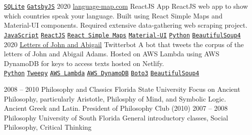 \documentclass[9pt]{developercv} %
\begin{document}
\begin{entrylist}
{        \texttt{{\href{https://www.sqlite.org/index.html}{SQLite}}}\slashsep
        \texttt{{\href{https://www.gatsbyjs.org/}{GatsbyJS}}}
        }
    \entry
        {2020}
        {\href{https://language-map.com}{language-map.com}}
        {ReactJS App}
        {
            ReactJS web app to show which countries speak your language. Built
            using React Simple Maps and Material-UI components. Required
            extensive data-gathering web scraping project.
        \\
        \texttt{{\href{https://en.wikipedia.org/wiki/JavaScript}{JavaScript}}}\slashsep
        \texttt{{\href{https://reactjs.org/}{ReactJS}}}\slashsep
        \texttt{{\href{https://www.react-simple-maps.io/}{React Simple Maps}}}\slashsep
        \texttt{{\href{https://material-ui.com/}{Material-UI}}}\slashsep
        \texttt{{\href{https://www.python.org/}{Python}}}\slashsep
        \texttt{{\href{https://www.crummy.com/software/BeautifulSoup/}{BeautifulSoup4}}}
        }
	\entry
		{2020}
        {{\href{https://twitter.com/john_and_abbie}{Letters of John and Abigail}}}
		{Twitterbot}
        {
            A bot that tweets the corpus of the letters of John and Abigail
            Adams. Hosted on AWS Lambda using AWS DynamoDB for keys to access
            texts hosted on Netlify.
        \\
        \texttt{{\href{https://www.python.org/}{Python}}}\slashsep
        \texttt{{\href{https://www.tweepy.org/}{Tweepy}}}\slashsep
        \texttt{{\href{https://aws.amazon.com/lambda/}{AWS Lambda}}}\slashsep
        \texttt{{\href{https://aws.amazon.com/dynamodb/}{AWS DynamoDB}}}\slashsep
        \texttt{{\href{https://boto3.amazonaws.com/v1/documentation/api/latest/index.html}{Boto3}}}\slashsep
        \texttt{{\href{https://www.crummy.com/software/BeautifulSoup/}{BeautifulSoup4}}}
        }
\end{entrylist}



\begin{entrylist}
	\entry
		{2008 -- 2010}
		{Philosophy and Classics}
		{Florida State University}
        {Focus on Ancient Philosophy, particularly Aristotle, Philosphy of Mind,
        and Symbolic Logic. Ancient Greek and Latin. President of Philosophy
        Club (2010)}
	\entry
		{2007 -- 2008}
		{Philosophy}
		{University of South Florida}
        {General introductory classes, Social Philosophy, Critical Thinking}
\end{entrylist}
\end{document}
